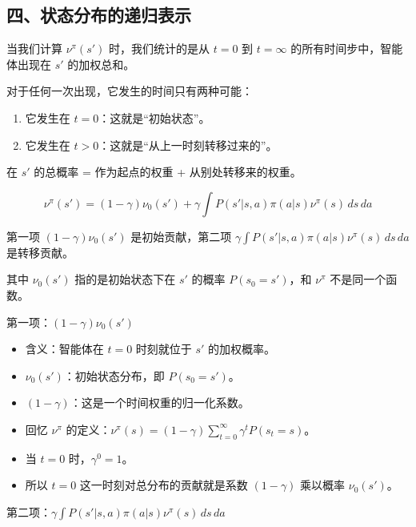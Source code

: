 \hypertarget{ux56dbux72b6ux6001ux5206ux5e03ux7684ux9012ux5f52ux8868ux793a}{%
\subsection{四、状态分布的递归表示}\label{ux56dbux72b6ux6001ux5206ux5e03ux7684ux9012ux5f52ux8868ux793a}}

当我们计算 \(\nu^\pi(s')\) 时，我们统计的是从 \(t=0\) 到 \(t=\infty\) 的所有时间步中，智能体出现在 \(s'\) 的加权总和。

对于任何一次出现，它发生的时间只有两种可能：

\begin{enumerate}
\def\labelenumi{\arabic{enumi}.}
\tightlist
\item
  它发生在 \(t=0\)：这就是``初始状态''。
\item
  它发生在 \(t>0\)：这就是``从上一时刻转移过来的''。
\end{enumerate}

在 \(s'\) 的总概率 = 作为起点的权重 + 从别处转移来的权重。

\[
\nu^\pi(s') = (1-\gamma)\nu_0(s') + \gamma\int P(s'|s,a)\pi(a|s)\nu^\pi(s)\,ds\,da
\]

第一项 \((1-\gamma)\nu_0(s')\) 是初始贡献，第二项 \(\gamma\int P(s'|s,a)\pi(a|s)\nu^\pi(s)\,ds\,da\) 是转移贡献。

其中 \(\nu_0(s')\) 指的是初始状态下在 \(s'\) 的概率 \(P(s_0=s')\)，和 \(\nu^\pi\) 不是同一个函数。

第一项：\((1-\gamma)\nu_0(s')\)

\begin{itemize}
\tightlist
\item
  含义：智能体在 \(t=0\) 时刻就位于 \(s'\) 的加权概率。
\item
  \(\nu_0(s')\)：初始状态分布，即 \(P(s_0=s')\)。
\item
  \((1-\gamma)\)：这是一个时间权重的归一化系数。
\item
  回忆 \(\nu^\pi\) 的定义：\(\nu^\pi(s)=(1-\gamma)\sum_{t=0}^{\infty}\gamma^t P(s_t=s)\)。
\item
  当 \(t=0\) 时，\(\gamma^0=1\)。
\item
  所以 \(t=0\) 这一时刻对总分布的贡献就是系数 \((1-\gamma)\) 乘以概率 \(\nu_0(s')\)。
\end{itemize}

第二项：\(\gamma\int P(s'|s,a)\pi(a|s)\nu^\pi(s)\,ds\,da\)

